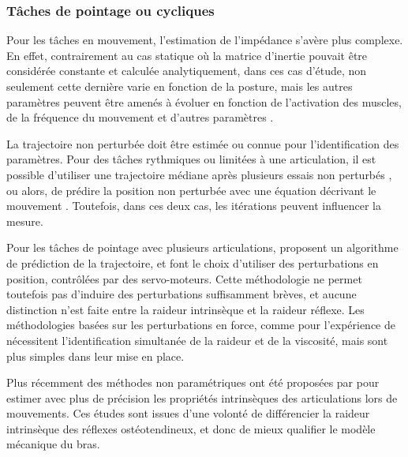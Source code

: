 \documentclass[12pt, a4paper]{article} %
\begin{document}
\subsubsection{Tâches de pointage ou cycliques}


Pour les tâches en mouvement, l'estimation de l'impédance s'avère plus complexe. En effet, contrairement au cas statique où la matrice d'inertie pouvait être considérée constante et calculée analytiquement, dans ces cas d'étude, non seulement cette dernière varie en fonction de la posture, mais les autres paramètres peuvent être amenés à évoluer en fonction de l'activation des muscles, de la fréquence du mouvement et d'autres paramètres \citep{milner_dependence_1993, abe_modulation_2003, kuxhaus_dependence_2014}. 

\newlineBlank

La trajectoire non perturbée doit être estimée ou connue pour l'identification des paramètres. Pour des tâches rythmiques ou limitées à une articulation, il est possible d'utiliser une trajectoire médiane après plusieurs essais non perturbés \citep{bennett_time-varying_1992, inbar_modeling_1995}, ou alors, de prédire la position non perturbée avec une équation décrivant le mouvement \citep{abe_modulation_2003}. Toutefois, dans ces deux cas, les itérations peuvent influencer la mesure.

\newlineBlank

Pour les tâches de pointage avec plusieurs articulations, \cite{burdet_method_2000} proposent un algorithme de prédiction de la trajectoire, et font le choix d'utiliser des perturbations en position, contrôlées par des servo-moteurs. Cette méthodologie ne permet toutefois pas d'induire des perturbations suffisamment brèves, et aucune distinction n'est faite entre la raideur intrinsèque et la raideur réflexe. Les méthodologies basées sur les perturbations en force, comme pour l'expérience de \cite{gomi_human_1997} nécessitent l'identification simultanée de la raideur et de la viscosité, mais sont plus simples dans leur mise en place.

\newlineBlank

Plus récemment des méthodes non paramétriques ont été proposées par \cite{ludvig_identification_2011, guarin_unbiased_2018, cavallo_nonparametric_2018} pour estimer avec plus de précision les propriétés intrinsèques des articulations lors de mouvements. Ces études sont issues d'une volonté de différencier la raideur intrinsèque des réflexes ostéotendineux, et donc de mieux qualifier le modèle mécanique du bras.
\end{document}
